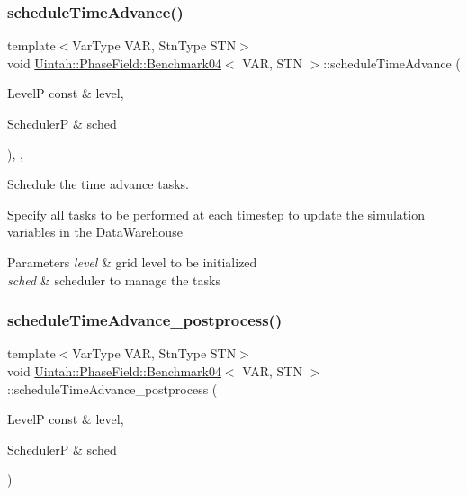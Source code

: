 \subsubsection{\texorpdfstring{schedule\+Time\+Advance()}{scheduleTimeAdvance()}}
{\footnotesize\ttfamily template$<$Var\+Type V\+AR, Stn\+Type S\+TN$>$ \\
void \hyperlink{classUintah_1_1PhaseField_1_1Benchmark04}{Uintah\+::\+Phase\+Field\+::\+Benchmark04}$<$ V\+AR, S\+TN $>$\+::schedule\+Time\+Advance (\begin{DoxyParamCaption}\item[{LevelP const \&}]{level,  }\item[{SchedulerP \&}]{sched }\end{DoxyParamCaption})\hspace{0.3cm}{\ttfamily [override]}, {\ttfamily [protected]}, {\ttfamily [virtual]}}



Schedule the time advance tasks. 

Specify all tasks to be performed at each timestep to update the simulation variables in the Data\+Warehouse


\begin{DoxyParams}{Parameters}
{\em level} & grid level to be initialized \\
\hline
{\em sched} & scheduler to manage the tasks \\
\hline
\end{DoxyParams}
\mbox{\label{classUintah_1_1PhaseField_1_1Benchmark04_a82f67970e8a33d7c463ce281c56eec74}} 
\subsubsection{\texorpdfstring{schedule\+Time\+Advance\+\_\+postprocess()}{scheduleTimeAdvance\_postprocess()}}
{\footnotesize\ttfamily template$<$Var\+Type V\+AR, Stn\+Type S\+TN$>$ \\
void \hyperlink{classUintah_1_1PhaseField_1_1Benchmark04}{Uintah\+::\+Phase\+Field\+::\+Benchmark04}$<$ V\+AR, S\+TN $>$\+::schedule\+Time\+Advance\+\_\+postprocess (\begin{DoxyParamCaption}\item[{LevelP const \&}]{level,  }\item[{SchedulerP \&}]{sched }\end{DoxyParamCaption})\hspace{0.3cm}{\ttfamily [protected]}}



